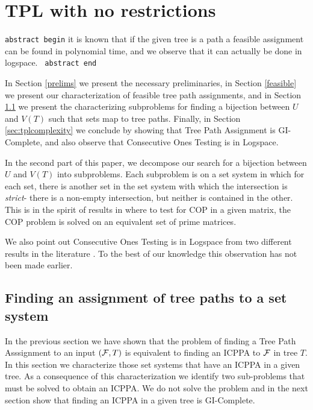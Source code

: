 \section{ TPL with no restrictions}
\label{sec:norestraint}

{\tt abstract begin} it is known that if the given tree is a path a
feasible assignment can be found in polynomial time, and we observe
that it can actually be done in logspace. \tnote{[TRUE?]}  {\tt
  abstract end}

In Section \ref{prelims} we present the necessary preliminaries, in
Section \ref{feasible} we present our characterization of feasible
tree path assignments, and in Section \ref{sec:decompos} we present the
characterizing subproblems for finding a bijection between $U$ and
$V(T)$ such that sets map to tree paths. Finally, in Section
\ref{sec:tplcomplexity} we conclude by showing that Tree Path Assignment is
GI-Complete, and also observe that Consecutive Ones Testing is in
Logspace.




In the second part of this paper, we decompose our search for a
bijection between $U$ and $V(T)$ into subproblems.  Each subproblem is
on a set system in which for each set, there is another set in the set
system with which the intersection is {\em strict}- there is a
non-empty intersection, but neither is contained in the other.  This
is in the spirit of results in \cite{wlh02,nsnrs09} where to test for
COP in a given matrix, the COP problem is solved on an equivalent set
of prime matrices.

We also point out Consecutive Ones Testing is in Logspace from two
different results in the literature \cite{kklv10, mcc04}. To the best
of our knowledge this observation has not been made earlier.


\subsection{Finding an assignment of tree paths to a set
  system}%
\label{sec:decompos}%
In the previous section we have shown that
the problem of finding a Tree Path Asssignment to an input $({\cal F},T)$
is equivalent to finding an ICPPA to ${\cal F}$ in tree $T$.  In this
section we characterize those set systems that have an ICPPA in a
given tree.  As a consequence of this characterization we identify two
sub-problems that must be solved to obtain an ICPPA.  We do not solve
the problem and in the next section show that finding an ICPPA in a
given tree is GI-Complete.

